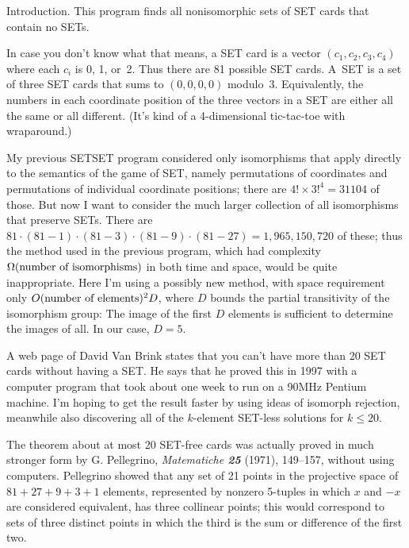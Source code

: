 
\hypertextrue\srcloctrue
\datethis
\def\SET/{{\mc SET\null}}


Introduction. This program finds all nonisomorphic sets
of \SET/ cards
that contain no \SET/s.

In case you don't know what that means, a \SET/ card is a vector
$(c_1,c_2,c_3,c_4)$ where each $c_i$ is 0, 1, or~2. Thus there are 81
possible \SET/ cards. A~\SET/ is a set of three \SET/ cards that sums
to $(0,0,0,0)$ modulo~3. Equivalently, the numbers in each coordinate
position of the three vectors in a \SET/ are either all the same or all
different. (It's kind of a 4-dimensional tic-tac-toe with wraparound.)

My previous {\sc SETSET} program considered only isomorphisms that
apply directly to the semantics of the game of \SET/, namely
permutations of coordinates and permutations of individual coordinate
positions; there are $4!\times 3!^4=31104$ of those. But now I want
to consider the much larger collection of all isomorphisms that
preserve \SET/s. There are $81\cdot(81-1)\cdot(81-3)\cdot(81-9)\cdot(81-27)
=1{,}965{,}150{,}720$ of these; thus the method used in the
previous program, which had complexity $\Omega(\hbox{number of isomorphisms})$
in both time and space, would be quite inappropriate. Here I'm using
a possibly new method, with space requirement only
$O(\hbox{number of elements})^2D$, where $D$ bounds the partial
transitivity of the isomorphism group: The image of the first $D$ elements
is sufficient to determine the images of all. In our case, $D=5$.

A web page of David Van Brink states that you can't have more than 20 \SET/
cards without having a \SET/. He says that he proved this in 1997 with a
computer program that took about one week to run on a 90MHz Pentium machine.
I'm hoping to get the result faster by using ideas of isomorph rejection,
meanwhile also discovering all of the $k$-element \SET/-less solutions
for $k\le20$.

The theorem about at most 20 \SET/-free cards was actually proved in much
stronger form by G. Pellegrino, {\sl Matematiche\/ \bf25} (1971), 149--157,
without using computers. Pellegrino showed that any set of 21 points in
the projective space of $81+27+9+3+1$ elements, represented by nonzero
5-tuples in which $x$ and $-x$ are considered equivalent, has three
collinear points; this would correspond to sets of three distinct points
in which the third is the sum or difference of the first two.

